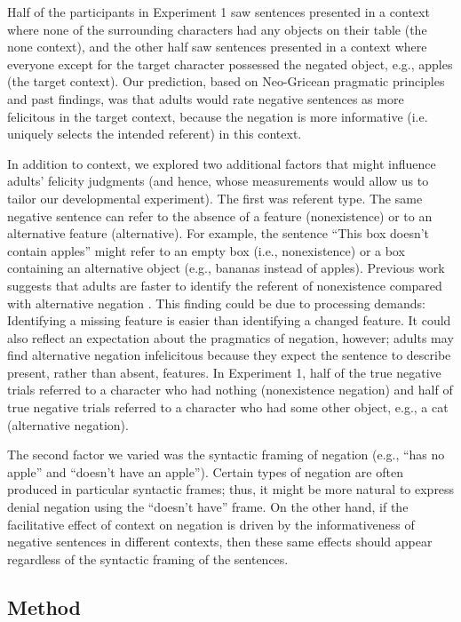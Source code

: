 \documentclass[man, noapacite]{apa2}
\begin{document}
Half of the participants in Experiment 1 saw sentences presented in a context where none of the surrounding characters had any objects on their table (the none context), and the other half saw sentences presented in a context where everyone except for the target character possessed the negated object, e.g., apples (the target context). Our prediction, based on Neo-Gricean pragmatic principles and past findings, was that adults would rate negative sentences as more felicitous in the target context, because the negation is more informative (i.e. uniquely selects the intended referent) in this context.

In addition to context, we explored two additional factors that might influence adults' felicity judgments (and hence, whose measurements would allow us to tailor our developmental experiment). The first was referent type. The same negative sentence can refer to the absence of a feature (nonexistence) or to an alternative feature (alternative). For example, the sentence ``This box doesn't contain apples'' might refer to an empty box (i.e., nonexistence) or a box containing an alternative object (e.g., bananas instead of apples). Previous work suggests that adults are faster to identify the referent of nonexistence compared with alternative negation \cite{nordmeyer2013, nordmeyer2014b}. This finding could be due to processing demands: Identifying a missing feature is easier than identifying a changed feature. It could also reflect an expectation about the pragmatics of negation, however; adults may find alternative negation infelicitous because they expect the sentence to describe present, rather than absent, features. In Experiment 1, half of the true negative trials referred to a character who had nothing (nonexistence negation) and half of true negative trials referred to a character who had some other object, e.g., a cat (alternative negation).

The second factor we varied was the syntactic framing of negation (e.g., ``has no apple'' and ``doesn't have an apple''). Certain types of negation are often produced in particular syntactic frames; thus, it might be more natural to express denial negation using the ``doesn't have'' frame. On the other hand, if the facilitative effect of context on negation is driven by the informativeness of negative sentences in different contexts, then these same effects should appear regardless of the syntactic framing of the sentences.

\subsection{Method}
\end{document}
